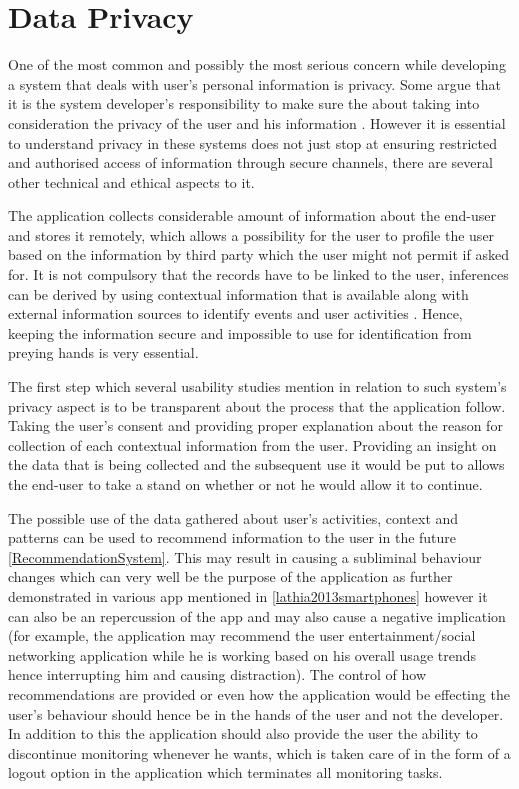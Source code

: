 \documentclass[12pt]{report}
\begin{document}
\section{Data Privacy}
\label{UserPrivacy}
One of the most common and possibly the most serious concern while developing a system that deals with user's personal information is privacy. Some argue that it is the system developer's responsibility to make sure the about taking into consideration the privacy of the user and his information \cite{adams2001privacy}. However it is essential to understand privacy in these systems does not just stop at ensuring restricted and authorised access of information through secure channels, there are several other technical and ethical aspects to it.

The application collects considerable amount of information about the end-user and stores it remotely, which allows a possibility for the user to profile the user based on the information  by third party which the user might not permit if asked for. It is not compulsory that the records have to be linked to the user, inferences can be derived by using contextual information that is available along with external information sources to identify events and user activities \cite{minch2004privacy}. Hence, keeping the information secure and impossible to use for identification from preying hands is very essential.

The first step which several usability studies mention in relation to such system's privacy aspect is to be transparent about the process that the application follow. Taking the user's consent and providing proper explanation about the reason for collection of each contextual information from the user.\cite{SymmKK2006,picard2002computers} Providing an insight on the data that is being collected and the subsequent use it would be put to allows the end-user to take a stand on whether or not he would allow it to continue.

The possible use of the data gathered about user's activities, context and patterns can be used to recommend information to the user in the future \ref{RecommendationSystem}. This may result in causing a subliminal behaviour changes which can very well be the purpose of the application as further demonstrated in various app mentioned in \ref{lathia2013smartphones} however it can also be an repercussion of the app and may also cause a negative implication (for example, the application may recommend the user entertainment/social networking application while he is working based on his overall usage trends hence interrupting him and causing distraction). The control of how recommendations are provided or even how the application would be effecting the user's behaviour should hence be in the hands of the user and not the developer. In addition to this the application should also provide the user the ability to discontinue monitoring whenever he wants, which is taken care of in the form of a logout option in the application which terminates all monitoring tasks.
\end{document}
